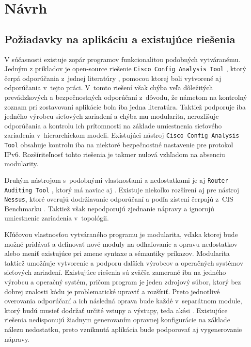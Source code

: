 \chapter{Návrh}

\section{Požiadavky na aplikáciu a existujúce riešenia}
V súčasnosti existuje zopár programov funkcionalitou podobných vytváranému. Jedným z príkladov je open-source riešenie \texttt{Cisco Config Analysis Tool} \cite{AU81CvNW4q8RGnqM}, ktorý čerpá odporúčania z~jednej literatúry \cite{Singh2018}, pomocou ktorej boli vytvorené aj odporúčania v~tejto práci. V~tomto riešení však chýba veľa dôležitých prevádzkových a bezpečnostných odporúčaní z~dôvodu, že námetom na kontrolný zoznam pri zostavovaní aplikácie bola iba jedna literatúra. Taktiež podporuje iba jedného výrobcu sieťových zariadení a chýba mu modularita, nerozlišuje odporúčania a kontrolu ich prítomnosti na základe umiestnenia sieťového zariadenia v~hierarchickom modeli. Existujúci nástroj \texttt{Cisco Config Analysis Tool} obsahuje kontrolu iba na niektoré bezpečnostné nastavenie pre protokol IPv6. Rozšíriteľnosť tohto riešenia je takmer nulová vzhľadom na absenciu modularity.

\vspace{1em}
\noindent
Druhým nástrojom s~podobnými vlastnosťami a nedostatkami je aj \texttt{Router Auditing Tool} \cite{OniomAfGpef53LHq}, ktorý má naviac aj . Existuje niekoľko rozšírení aj pre nástroj \texttt{Nessus}, ktoré overujú dodržiavanie odporúčaní a podľa zistení čerpajú z~CIS Benchmarku \cite{CIS_DrTLsgXv24lxeIIM}. Taktiež však nepodporujú zjednanie nápravy a ignorujú umiestnenie zariadenia v~topológii.

\vspace{1em}
\noindent
Kľúčovou vlastnosťou vytváraného programu je modularita, vďaka ktorej bude možné pridávať a definovať nové moduly na odhaľovanie a opravu nedostatkov alebo meniť existujúce pri zmene syntaxe a sémantiky príkazov. Modularita taktiež umožňuje vytvorenie a podporu ďalších výrobcov a operačných systémov sieťových zariadení. Existujúce riešenia sú zväčša zamerané iba na jedného výrobcu a operačný systém, pričom program je jeden zdrojový súbor, ktorý bez dobrej znalosti kódu je problematické upraviť a rozšíriť. Preto jednotlivé overovania odporúčaní a ich následná oprava bude každé v~separátnom module, ktorý budú musieť dodržať určité vstupy a výstupy, teda akési . Existujúce riešenia nedisponujú žiadnym generovaním opravnej konfigurácie na základe nálezu nedostatku, preto vzniknutá aplikácia bude podporovať aj vygenerovanie nápravy.

